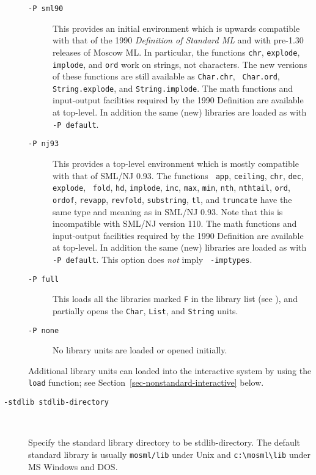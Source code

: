 \documentclass[fleqn]{article}
\begin{document}
\begin{description}
\begin{description}
  \item[{\tt -P sml90}] This provides an initial environment which is
    upwards compatible with that of the 1990 {\em Definition of
      Standard ML\/} and with pre-1.30 releases of Moscow ML\@.  In
    particular, the functions {\tt chr}, {\tt explode}, {\tt implode},
    and {\tt ord} work on strings, not characters.  The new versions
    of these functions are still available as {\tt Char.chr}, {\tt
      Char.ord}, {\tt String.explode}, and {\tt String.implode}.  The
    math functions and input-output facilities required by the 1990
    Definition \cite[Appendix C and D]{Milner:1990:TheDefinition} are
    available at top-level.  In addition the same (new) libraries are
    loaded as with {\tt -P default}.

  \item[{\tt -P nj93}] This provides a top-level environment which is
    mostly compatible with that of SML/NJ 0.93.  The functions {\tt
      app}, {\tt ceiling}, {\tt chr}, {\tt dec}, {\tt explode}, {\tt
      fold}, {\tt hd}, {\tt implode}, {\tt inc}, {\tt max}, {\tt min},
    {\tt nth}, {\tt nthtail}, {\tt ord}, {\tt ordof}, {\tt revapp},
    {\tt revfold}, {\tt substring}, {\tt tl}, and {\tt truncate} have
    the same type and meaning as in SML/NJ 0.93.  Note that this is
    incompatible with SML/NJ version 110\@.  The math functions and
    input-output facilities required by the 1990 Definition
    \cite[Appendix C and D]{Milner:1990:TheDefinition} are available
    at top-level.  In addition the same (new) libraries are loaded as
    with {\tt -P default}.  This option does {\em not\/} imply {\tt
      -imptypes}.

  \item[{\tt -P full}] This loads all the libraries marked {\tt F} in
    the library list (see \cite{MoscowML:1999:MoscowMLLanguage}), and
  partially opens the {\tt Char}, {\tt List}, and {\tt String} units.

  \item[{\tt -P none}] No library units are loaded or opened initially.
  \end{description}
  
  Additional library units can loaded into the interactive system by
  using the {\tt load} function; see
  Section~\ref{sec-nonstandard-interactive} below.
  
\item[{\tt -stdlib {\rm stdlib-directory}}]\mbox{ }

  Specify the standard library directory to be stdlib-directory.  The
  default standard library is usually {\tt mosml/lib} under Unix and
  \verb#c:\mosml\lib# under MS Windows and DOS.
\end{description}
\end{document}

